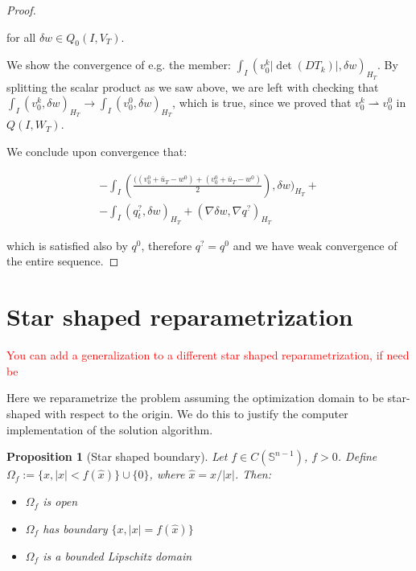 \documentclass[english,a4paper,10pt,oneside]{scrbook}	%
\theoremstyle{break}
\newtheorem{prop}[equation]{Proposition}
\newenvironment{mproof}[1][\proofname]{%
  \begin{proof}[#1]$ $\par\nobreak\ignorespaces
}{%
  \end{proof}
}
\renewcommand*{\proofname}{Proof}
\theoremstyle{remark}
\newcommand{\mS}{\mathbb{S}^{n-1}}
\newcommand{\weakc}{\rightharpoonup}
\newcommand{\xh}{\hat{x}}
\begin{document}
\begin{mproof}
for all $\delta w \in Q_0(I,V_{ T})$.

We show the convergence of e.g. the member: $\int_I( v_0^k|\det(DT_k)|,\delta w)_{H_T}$. By splitting the scalar product as we saw above, we are left with checking that $\int_I (v_0^k,\delta w)_{H_T}\rightarrow  \int_I (v_0^0,\delta w)_{H_T}$, which is true, since we proved that $v_0^k \weakc v_0^0$ in $Q(I,W_T)$.

We conclude upon convergence that:

\begin{align*}
-\int_I \left (\frac{((v_0^0+\bar{u}_T - w^0)+(v_0^0+\bar{u}_T - w^0)}{2}\right ),\delta w)_{H_T}+\\
-\int_I (  q^?_t ,   \delta w )_{H_T}+ (\nabla \delta w, \nabla q^?)_{H_T}
\end{align*}

which is satisfied also by $q^0$, therefore $q^? = q^0$ and we have weak convergence of the entire sequence.

\end{mproof}

\section{Star shaped reparametrization}

\textcolor{red}{You can add a generalization to a different star shaped reparametrization, if need be}

Here we reparametrize the problem assuming the optimization domain to be star-shaped with respect to the origin. We do this to justify the computer implementation of the solution algorithm.

\begin{prop}[Star shaped boundary]
Let $f \in C(\mS)$, $f>0$. Define $\Omega_f:=\{x, |x|<f(\xh)\}\cup\{0\}$, where $\xh=x/|x|$. Then:
\begin{itemize}
\item $\Omega_f$ is open
\item $\Omega_f$ has boundary $\{x, |x|=f(\xh)\}$
\item $\Omega_f$ is a bounded Lipschitz domain
\end{itemize}
\end{prop}
\end{document}
